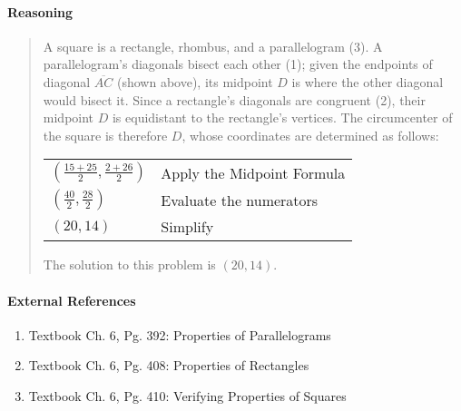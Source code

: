 \documentclass[letterpaper,12pt,twoside]{report}
\begin{document}
	\paragraph{Reasoning}
	\begin{quotation}
		
		A square is a rectangle, rhombus, and a parallelogram (3). A parallelogram's diagonals bisect each other (1); given the endpoints of diagonal $\overline{AC}$ (shown above), its midpoint $D$ is where the other diagonal would bisect it. Since a rectangle's diagonals are congruent (2), their midpoint $D$ is equidistant to the rectangle's vertices. The circumcenter of the square is therefore $D$, whose coordinates are determined as follows:
		
		\begin{center}
			\begin{tabular}{l | l}
				$(\frac{15+25}{2},\frac{2+26}{2})$ & Apply the Midpoint Formula \\
				$(\frac{40}{2},\frac{28}{2})$ & Evaluate the numerators \\
				$(20,14)$ & Simplify
			\end{tabular}
		\end{center}
	
	\iffalse
		Since a rhombus's diagonals are perpendicular, $\overline{BE} \bot \overline{CA}$, which means that the angles formed by the intersection ($\angle BDA,\angle EDA,\angle EDC,\angle CDB$) are right angles. Since all right angles are congruent, $\angle BDA\cong\angle EDA\cong\angle EDC\cong\angle CDB$. Draw $\overline{DF},\overline{DG},\overline{DH}, \text{and} \overline{DJ}$ from $D$ such that each is perpendicular to the square's side that it touches, signifying the distance from $D$ to this side.
		\fi
		The solution to this problem is $\boxed{(20,14)}$.
	\end{quotation}
	
	\paragraph{External References}
	
	\begin{enumerate}
		\item Textbook Ch. 6, Pg. 392: Properties of Parallelograms
		\item Textbook Ch. 6, Pg. 408: Properties of Rectangles
		\item Textbook Ch. 6, Pg. 410: Verifying Properties of Squares
	\end{enumerate}
	
\end{document}

